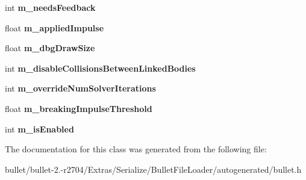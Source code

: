 \begin{DoxyCompactItemize}
\item 
\hypertarget{class_bullet_1_1bt_typed_constraint_float_data_a97183e59a8591926823d95e082248176}{int {\bfseries m\+\_\+needs\+Feedback}}\label{class_bullet_1_1bt_typed_constraint_float_data_a97183e59a8591926823d95e082248176}

\item 
\hypertarget{class_bullet_1_1bt_typed_constraint_float_data_a13f7df33b430c2154034c9017c1405f0}{float {\bfseries m\+\_\+applied\+Impulse}}\label{class_bullet_1_1bt_typed_constraint_float_data_a13f7df33b430c2154034c9017c1405f0}

\item 
\hypertarget{class_bullet_1_1bt_typed_constraint_float_data_a0e1a7799a7b622487913b9bee8efb979}{float {\bfseries m\+\_\+dbg\+Draw\+Size}}\label{class_bullet_1_1bt_typed_constraint_float_data_a0e1a7799a7b622487913b9bee8efb979}

\item 
\hypertarget{class_bullet_1_1bt_typed_constraint_float_data_a39572b62c1601d78dcba59983420f6bb}{int {\bfseries m\+\_\+disable\+Collisions\+Between\+Linked\+Bodies}}\label{class_bullet_1_1bt_typed_constraint_float_data_a39572b62c1601d78dcba59983420f6bb}

\item 
\hypertarget{class_bullet_1_1bt_typed_constraint_float_data_a3a9f6f2140fddeee8faf7990780438b3}{int {\bfseries m\+\_\+override\+Num\+Solver\+Iterations}}\label{class_bullet_1_1bt_typed_constraint_float_data_a3a9f6f2140fddeee8faf7990780438b3}

\item 
\hypertarget{class_bullet_1_1bt_typed_constraint_float_data_a9cfa8a966bc4e7b32d12268923805ef9}{float {\bfseries m\+\_\+breaking\+Impulse\+Threshold}}\label{class_bullet_1_1bt_typed_constraint_float_data_a9cfa8a966bc4e7b32d12268923805ef9}

\item 
\hypertarget{class_bullet_1_1bt_typed_constraint_float_data_a14c6e0e1c2912ba8fb7b28552dc742ec}{int {\bfseries m\+\_\+is\+Enabled}}\label{class_bullet_1_1bt_typed_constraint_float_data_a14c6e0e1c2912ba8fb7b28552dc742ec}

\end{DoxyCompactItemize}


The documentation for this class was generated from the following file\+:\begin{DoxyCompactItemize}
\item 
bullet/bullet-\/2.-\/r2704/\+Extras/\+Serialize/\+Bullet\+File\+Loader/autogenerated/bullet.\+h\end{DoxyCompactItemize}
